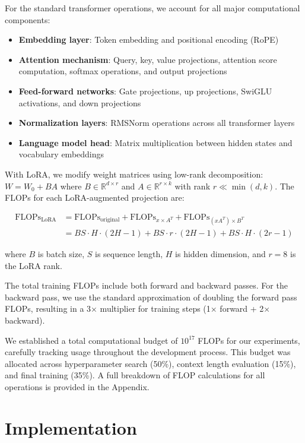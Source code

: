 \documentclass{article}
\begin{document}
For the standard transformer operations, we account for all major computational components:

\begin{itemize}
    \item \textbf{Embedding layer}: Token embedding and positional encoding (RoPE)
    \item \textbf{Attention mechanism}: Query, key, value projections, attention score computation, softmax operations, and output projections
    \item \textbf{Feed-forward networks}: Gate projections, up projections, SwiGLU activations, and down projections
    \item \textbf{Normalization layers}: RMSNorm operations across all transformer layers
    \item \textbf{Language model head}: Matrix multiplication between hidden states and vocabulary embeddings
\end{itemize}

With LoRA, we modify weight matrices using low-rank decomposition: $W = W_0 + BA$ where $B \in \mathbb{R}^{d \times r}$ and $A \in \mathbb{R}^{r \times k}$ with rank $r \ll \min(d,k)$. The FLOPs for each LoRA-augmented projection are:

\begin{align}
\text{FLOPs}_{\text{LoRA}} &= \text{FLOPs}_{\text{original}} + \text{FLOPs}_{x \times A^T} + \text{FLOPs}_{(xA^T) \times B^T}\\
&= BS \cdot H \cdot (2H - 1) + BS \cdot r \cdot (2H - 1) + BS \cdot H \cdot (2r - 1)
\end{align}

where $B$ is batch size, $S$ is sequence length, $H$ is hidden dimension, and $r=8$ is the LoRA rank.

The total training FLOPs include both forward and backward passes. For the backward pass, we use the standard approximation of doubling the forward pass FLOPs, resulting in a 3× multiplier for training steps (1× forward + 2× backward).

We established a total computational budget of $10^{17}$ FLOPs for our experiments, carefully tracking usage throughout the development process. This budget was allocated across hyperparameter search (50\%), context length evaluation (15\%), and final training (35\%). A full breakdown of FLOP calculations for all operations is provided in the Appendix.

\section*{Implementation}
\end{document}
